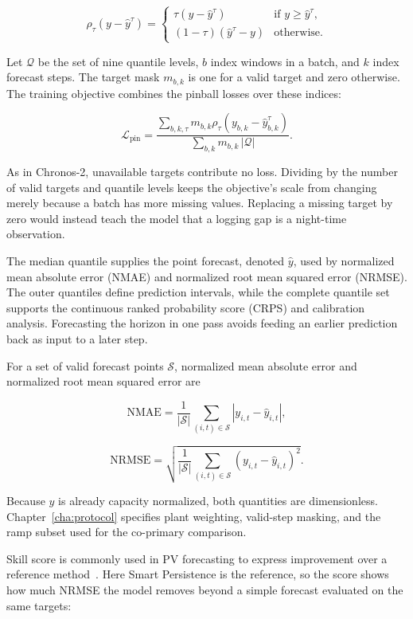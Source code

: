 \[
\rho_{\tau}(y-\hat{y}^{\tau}) =
\begin{cases}
\tau(y-\hat{y}^{\tau}) & \text{if } y \geq \hat{y}^{\tau},\\
(1-\tau)(\hat{y}^{\tau}-y) & \text{otherwise}.
\end{cases}
\]

Let $\mathcal{Q}$ be the set of nine quantile levels, $b$ index windows in a batch, and $k$ index forecast steps. The target mask $m_{b,k}$ is one for a valid target and zero otherwise. The training objective combines the pinball losses over these indices:

\[
\mathcal{L}_{\mathrm{pin}} = \frac{\sum_{b,k,\tau} m_{b,k}\rho_{\tau}(y_{b,k}-\hat{y}_{b,k}^{\tau})}{\sum_{b,k} m_{b,k}\,|\mathcal{Q}|}.
\]

As in Chronos-2, unavailable targets contribute no loss. Dividing by the number of valid targets and quantile levels keeps the objective's scale from changing merely because a batch has more missing values. Replacing a missing target by zero would instead teach the model that a logging gap is a night-time observation.

The median quantile supplies the point forecast, denoted $\hat{y}$, used by normalized mean absolute error (NMAE) and normalized root mean squared error (NRMSE). The outer quantiles define prediction intervals, while the complete quantile set supports the continuous ranked probability score (CRPS) and calibration analysis. Forecasting the horizon in one pass avoids feeding an earlier prediction back as input to a later step.

For a set of valid forecast points $\mathcal{S}$, normalized mean absolute error and normalized root mean squared error are

\[
\mathrm{NMAE} = \frac{1}{|\mathcal{S}|}\sum_{(i,t)\in\mathcal{S}} |y_{i,t}-\hat{y}_{i,t}|,
\]

\[
\mathrm{NRMSE} = \sqrt{\frac{1}{|\mathcal{S}|}\sum_{(i,t)\in\mathcal{S}} (y_{i,t}-\hat{y}_{i,t})^2}.
\]

Because $y$ is already capacity normalized, both quantities are dimensionless. Chapter~\ref{cha:protocol} specifies plant weighting, valid-step masking, and the ramp subset used for the co-primary comparison.

Skill score is commonly used in PV forecasting to express improvement over a reference method~\cite{singh2026pvforecastreview}. Here Smart Persistence is the reference, so the score shows how much NRMSE the model removes beyond a simple forecast evaluated on the same targets:

